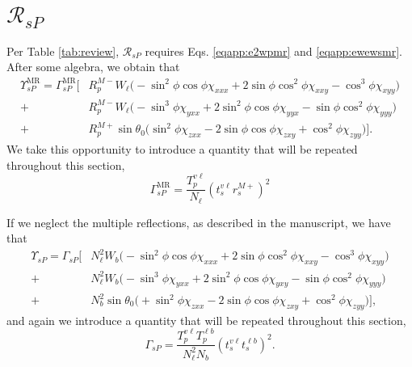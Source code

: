 

\section{\texorpdfstring{$\mathcal{R}_{sP}$}{RsP}}

Per Table \ref{tab:review}, $\mathcal{R}_{sP}$ requires Eqs.
\eqref{eqapp:e2wpmr} and \eqref{eqapp:ewewsmr}. After some algebra, we obtain that
\begin{equation}\label{eqapp:rspfullmr}
\begin{split}
\Upsilon^{\mathrm{MR}}_{sP} =
\Gamma^{\mathrm{MR}}_{sP}
\bigg[
&R^{M-}_{p}W_{\ell}
\big(
-\sin^{2}\phi\cos\phi\chi_{xxx}
+ 2\sin\phi\cos^{2}\phi\chi_{xxy}
- \cos^{3}\phi\chi_{xyy}
\big)\\
+&R^{M-}_{p}W_{\ell}
\big(
- \sin^{3}\phi\chi_{yxx}
+ 2\sin^{2}\phi\cos\phi \chi_{yyx}
- \sin\phi\cos^{2}\phi\chi_{yyy}
\big)\\
+&R^{M+}_{p}\sin\theta_{0}
\big(
\sin^{2}\phi\chi_{zxx}
- 2\sin\phi\cos\phi\chi_{zxy}
+ \cos^{2}\phi\chi_{zyy}
\big)
\bigg].
\end{split}
\end{equation}
We take this opportunity to introduce a quantity that will be repeated
throughout this section,
\begin{equation}\label{eqapp:gammaspmr}
\Gamma^{\mathrm{MR}}_{sP} =
\frac{T^{v\ell}_{p}}{N_{\ell}}
\left(t^{v\ell}_{s}r^{M+}_{s}\right)^{2}
\end{equation}

If we neglect the multiple reflections, as described in the manuscript, we have
that
\begin{equation}\label{eqapp:rspfull}
\begin{split}
\Upsilon_{sP} =
\Gamma_{sP}
\bigg[
&N^{2}_{\ell}W_{b}\big(
- \sin^{2}\phi\cos\phi\chi_{xxx}
+ 2\sin\phi\cos^{2}\phi\chi_{xxy}
- \cos^{3}\phi\chi_{xyy}
  \big)\\
+&N^{2}_{\ell}W_{b}\big(
- \sin^{3}\phi\chi_{yxx}
+ 2\sin^{2}\phi\cos\phi\chi_{yxy}
- \sin\phi\cos^{2}\phi\chi_{yyy}
  \big)\\
+&N^{2}_{b}\sin\theta_{0}\big(
+ \sin^{2}\phi\chi_{zxx}
- 2\sin\phi\cos\phi\chi_{zxy}
+ \cos^{2}\phi\chi_{zyy}
  \big)
\bigg],
\end{split}
\end{equation}
and again we introduce a quantity that will be repeated throughout this section,
\begin{equation}\label{eqapp:gammasp}
\Gamma_{sP} =
\frac{T^{v\ell}_{p}T^{\ell b}_{p}}{N^{2}_{\ell}N_{b}}
\left(t^{v\ell}_{s}t^{\ell b}_{s}\right)^{2}.
\end{equation}


